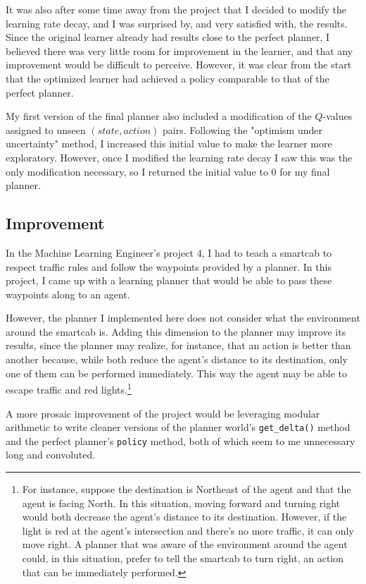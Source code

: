 \documentclass{article}
\begin{document}
It was also after some time away from the project that I decided to modify the learning rate decay, and I was surprised by, and very satisfied with, the results. Since the original learner already had results close to the perfect planner, I believed there was very little room for improvement in the learner, and that any improvement would be difficult to perceive. However, it was clear from the start that the optimized learner had achieved a policy comparable to that of the perfect planner.

My first version of the final planner also included a modification of the $Q$-values assigned to unseen $(state, action)$ pairs. Following the "optimism under uncertainty" method, I increased this initial value to make the learner more exploratory. However, once I modified the learning rate decay I saw this was the only modification necessary, so I returned the initial value to 0 for my final planner.

\subsection{Improvement}

In the Machine Learning Engineer's project 4, I had to teach a smartcab to respect traffic rules and follow the waypoints provided by a planner. In this project, I came up with a learning planner that would be able to pass these waypoints along to an agent.

However, the planner I implemented here does not consider what the environment around the smartcab is. Adding this dimension to the planner may improve its results, since the planner may realize, for instance, that an action is better than another because, while both reduce the agent's distance to its destination, only one of them can be performed immediately. This way the agent may be able to escape traffic and red lights.\footnote{For instance, suppose the destination is Northeast of the agent and that the agent is facing North. In this situation, moving forward and turning right would both decrease the agent's distance to its destination. However, if the light is red at the agent's intersection and there's no more traffic, it can only move right. A planner that was aware of the environment around the agent could, in this situation, prefer to tell the smartcab to turn right, an action that can be immediately performed.}

A more prosaic improvement of the project would be leveraging modular arithmetic to write cleaner versions of the planner world's \texttt{get\_delta()} method and the perfect planner's \texttt{policy} method, both of which seem to me unnecessary long and convoluted.
\end{document}
